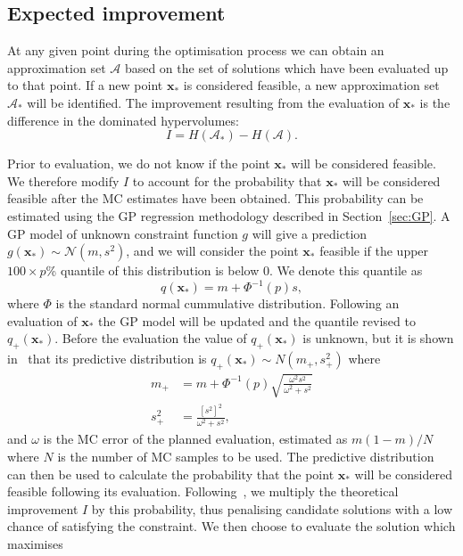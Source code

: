 \documentclass{article} %
\begin{document}
\subsection{Expected improvement}\label{sec:EGO}

At any given point during the optimisation process we can obtain an approximation set $\mathcal{A}$ based on the set of solutions which have been evaluated up to that point. If a new point $\mathbf{x}_{*}$ is considered feasible, a new approximation set $\mathcal{A}_{*}$ will be identified. The improvement resulting from the evaluation of $\mathbf{x}_{*}$ is the difference in the dominated hypervolumes:
\begin{equation}
I = H(\mathcal{A}_{*}) - H(\mathcal{A}).
\end{equation}

Prior to evaluation, we do not know if the point $\mathbf{x}_{*}$ will be considered feasible. We therefore modify $I$ to account for the probability that $\mathbf{x}_{*}$ will be considered feasible after the MC estimates have been obtained. This probability can be estimated using the GP regression methodology described in Section~\ref{sec:GP}. A GP model of unknown constraint function $g$ will give a prediction $g(\mathbf{x}_{*}) \sim \mathcal{N}(m, s^{2})$, and we will consider the point $\mathbf{x}_{*}$ feasible if the upper $100 \times p$\% quantile of this distribution is below 0. We denote this quantile as
\begin{equation}\label{eqn:quant}
q(\mathbf{x}_{*}) = m + \Phi^{-1}(p)s,
\end{equation}
where $\Phi$ is the standard normal cummulative distribution. Following an evaluation of $\mathbf{x}_{*}$ the GP model will be updated and the quantile revised to $q_{+}(\mathbf{x}_{*})$. Before the evaluation the value of $q_{+}(\mathbf{x}_{*})$ is unknown, but it is shown in~\cite{Picheny2014} that its predictive distribution is $q_{+}(\mathbf{x}_{*}) \sim N(m_{+}, s_{+}^{2})$ where
\begin{align}
m_{+} &= m + \Phi^{-1}(p)\sqrt{\frac{\omega^{2}s^{2}}{\omega^{2} + s^{2}}} \\
s_{+}^{2} &= \frac{[s^{2}]^{2}}{\omega^{2} + s^{2}},
\end{align}
and $\omega$ is the MC error of the planned evaluation, estimated as $m(1-m)/N$ where $N$ is the number of MC samples to be used. The predictive distribution can then be used to calculate the probability that the point $\mathbf{x}_{*}$ will be considered feasible following its evaluation. Following~\cite{Sasena2002}, we multiply the theoretical improvement $I$ by this probability, thus penalising candidate solutions with a low chance of satisfying the constraint. We then choose to evaluate the solution which maximises
\end{document}
